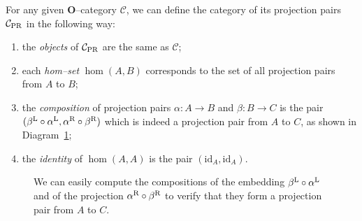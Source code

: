 For any given \(\mathbf{O}\)--category \(\mathcal{C}\), we can define the category of its projection pairs \(\mathcal{C}_\textup{PR}\) in the following way:
\begin{enumerate}
  \item the \emph{objects} of \(\mathcal{C}_\textup{PR}\) are the same as \(\mathcal{C}\);
  \item each \emph{hom--set} \(\hom(A,B)\) corresponds to the set of all projection pairs from \(A\) to \(B\);
  \item the \emph{composition} of projection pairs \(\alpha \colon A \to B\) and \(\beta \colon B \to C\) is the pair \((\beta^\textup{L} \circ \alpha^\textup{L}, \alpha^\textup{R} \circ \beta^\textup{R})\) which is indeed a projection pair from \(A\) to \(C\), as shown in Diagram~\ref{03:dia-1};
  \item the \emph{identity} of \(\hom(A,A)\) is the pair \((\mathrm{id}_A,\mathrm{id}_A)\).
\end{enumerate}
\begin{figure}%
  \begin{center}
  \end{center}
  \caption{We can easily compute the compositions of the embedding \(\beta^\textup{L} \circ \alpha^\textup{L}\) and of the projection \(\alpha^\textup{R} \circ \beta^\textup{R}\) to verify that they form a projection pair from \(A\) to \(C\).} 
  \label{03:dia-1}
\end{figure}
